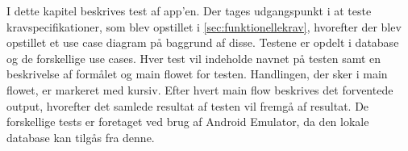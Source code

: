 I dette kapitel beskrives test af app'en. Der tages udgangspunkt i at teste kravspecifikationer, som blev opstillet i \autoref{sec:funktionellekrav}, hvorefter der blev opstillet et use case diagram på baggrund af disse. Testene er opdelt i database og de forskellige use cases. Hver test vil indeholde navnet på testen samt en beskrivelse af formålet og main flowet for testen. Handlingen, der sker i main flowet, er markeret med kursiv. Efter hvert main flow beskrives det forventede output, hvorefter det samlede resultat af testen vil fremgå af resultat. De forskellige tests er foretaget ved brug af Android Emulator, da den lokale database kan tilgås fra denne.


